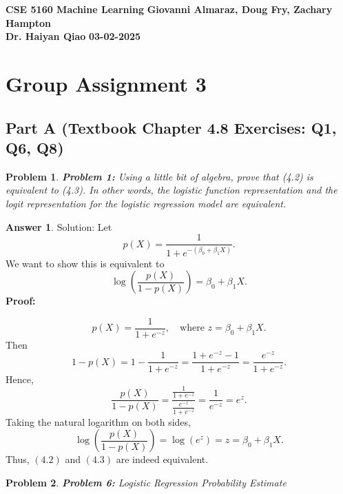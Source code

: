 \documentclass[12pt]{article}
\newtheorem{problem}{Problem} %
\theoremstyle{definition}
\newtheorem*{answer}{Answer}
\newcommand{\solution}{\textcolor{PineGreen}{Solution:\newline}}
\begin{document}
\begin{center}
\textbf{CSE 5160 Machine Learning} \hfill \textbf{Giovanni Almaraz, Doug Fry, Zachary Hampton}\\
\textbf{Dr. Haiyan Qiao} \hfill \textbf{03-02-2025}
\end{center}

\bigskip

\section*{Group Assignment 3}

\subsection*{Part A (Textbook Chapter 4.8 Exercises: Q1, Q6, Q8)}

\begin{problem}
\textbf{Problem 1:} Using a little bit of algebra, prove that (4.2) is equivalent to (4.3). In other words, the logistic function representation and the logit representation for the logistic regression model are equivalent.
\end{problem}

\begin{answer}
\solution
Let 
\[
p(X) = \frac{1}{1 + e^{-(\beta_0 + \beta_1 X)}}.
\]
We want to show this is equivalent to
\[
\log\left(\frac{p(X)}{1 - p(X)}\right) = \beta_0 + \beta_1 X.
\]
\textbf{Proof:}

\[
p(X) = \frac{1}{1 + e^{-z}}, \quad \text{where } z = \beta_0 + \beta_1 X.
\]
Then
\[
1 - p(X) 
= 1 - \frac{1}{1 + e^{-z}}
= \frac{1 + e^{-z} - 1}{1 + e^{-z}}
= \frac{e^{-z}}{1 + e^{-z}}.
\]
Hence,
\[
\frac{p(X)}{1 - p(X)} 
= \frac{\frac{1}{1 + e^{-z}}}{\frac{e^{-z}}{1 + e^{-z}}}
= \frac{1}{e^{-z}} 
= e^z.
\]
Taking the natural logarithm on both sides,
\[
\log\left(\frac{p(X)}{1 - p(X)}\right) = \log(e^z) = z = \beta_0 + \beta_1 X.
\]
Thus, \((4.2)\) and \((4.3)\) are indeed equivalent.
\end{answer}

\setcounter{problem}{5}
\begin{problem}
\textbf{Problem 6:} Logistic Regression Probability Estimate
\end{problem}
\end{document}
